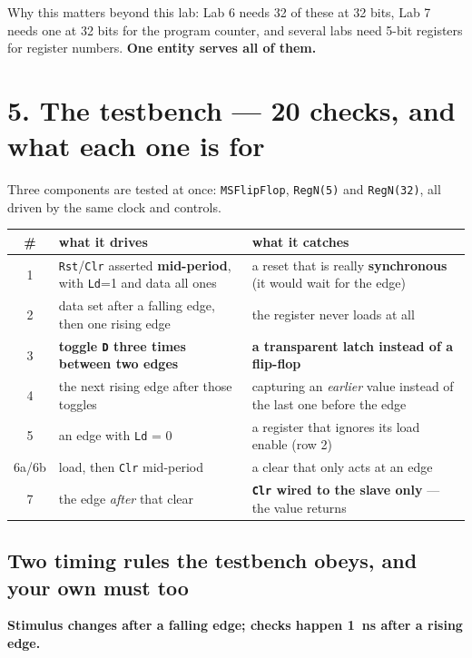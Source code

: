 \documentclass[11pt]{article}
\newcommand{\code}[1]{\texttt{#1}}
\begin{document}
Why this matters beyond this lab: Lab 6 needs 32 of these at 32 bits, Lab 7 needs
one at 32 bits for the program counter, and several labs need 5-bit registers for
register numbers. \textbf{One entity serves all of them.}

\section*{5. The testbench --- 20 checks, and what each one is for}

Three components are tested at once: \code{MSFlipFlop}, \code{RegN(5)} and
\code{RegN(32)}, all driven by the same clock and controls.

\begin{center}
\small
\begin{tabular}{c>{\raggedright\arraybackslash}p{6.6cm}>{\raggedright\arraybackslash}p{6.6cm}}
\toprule
\# & what it drives & what it catches \\
\midrule
1 & \code{Rst}/\code{Clr} asserted \textbf{mid-period}, with \code{Ld}=1 and data all ones
  & a reset that is really \textbf{synchronous} (it would wait for the edge) \\
2 & data set after a falling edge, then one rising edge
  & the register never loads at all \\
3 & \textbf{toggle \code{D} three times between two edges}
  & \textbf{a transparent latch instead of a flip-flop} \\
4 & the next rising edge after those toggles
  & capturing an \emph{earlier} value instead of the last one before the edge \\
5 & an edge with \code{Ld} = 0
  & a register that ignores its load enable (row 2) \\
6a/6b & load, then \code{Clr} mid-period
  & a clear that only acts at an edge \\
7 & the edge \emph{after} that clear
  & \textbf{\code{Clr} wired to the slave only} --- the value returns \\
\bottomrule
\end{tabular}
\end{center}

\subsection*{Two timing rules the testbench obeys, and your own must too}

\textbf{Stimulus changes after a falling edge; checks happen 1~ns after a rising
edge.}
\end{document}
